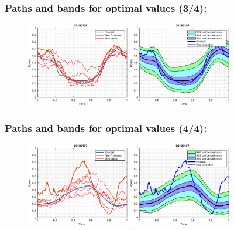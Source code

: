 \documentclass[aspectratio=169]{beamer}\usepackage[utf8]{inputenc}
\begin{document}
\begin{frame}\frametitle{Paths and bands for optimal values (3/4):}

\begin{figure}[ht!]
\centering
\includegraphics[width=0.4\textwidth]{../Results/paths_testing_days/optimal_value/3.eps}\quad
\includegraphics[width=0.4\textwidth]{../Results/bands_testing_days/optimal_value/3.eps}
\end{figure}

\end{frame}


\begin{frame}\frametitle{Paths and bands for optimal values (4/4):}

\begin{figure}[ht!]
\centering
\includegraphics[width=0.4\textwidth]{../Results/paths_testing_days/optimal_value/4.eps}\quad
\includegraphics[width=0.4\textwidth]{../Results/bands_testing_days/optimal_value/4.eps}
\end{figure}
\end{frame}
\end{document}
